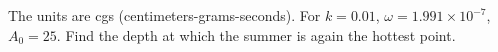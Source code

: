\begin{exercise}
The units are cgs (centimeters-grams-seconds).
For $k=0.01$, $\omega = 1.991 \times {10}^{-7}$, $A_0 = 25$.
Find the depth at which the summer is again the hottest point.
\end{exercise}
